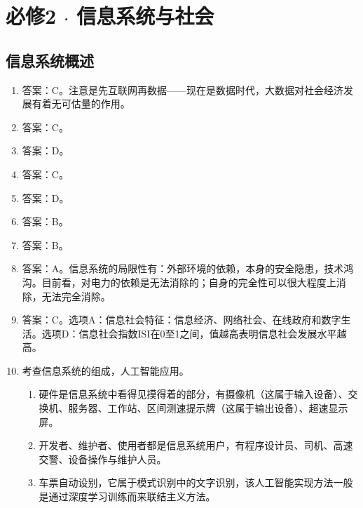 \chapter{必修2 $\cdot$ 信息系统与社会}
\section{信息系统概述}

\begin{enumerate}
\item 答案：C。注意是先互联网再数据——现在是数据时代，大数据对社会经济发展有着无可估量的作用。

\item 答案：C。

\item 答案：D。

\item 答案：C。

\item 答案：D。

\item 答案：B。

\item 答案：B。

\item 答案：A。信息系统的局限性有：外部环境的依赖，本身的安全隐患，技术鸿沟。目前看，对电力的依赖是无法消除的；自身的完全性可以很大程度上消除，无法完全消除。

\item 答案：C。选项A：信息社会特征：信息经济、网络社会、在线政府和数字生活。选项D：信息社会指数ISI在0至1之间，值越高表明信息社会发展水平越高。

\item 考查信息系统的组成，人工智能应用。
	\begin{enumerate}[label=$(\arabic*)$]
	\item 硬件是信息系统中看得见摸得着的部分，有摄像机（这属于输入设备）、交换机、服务器、工作站、区间测速提示牌（这属于输出设备）、超速显示屏。
	\item 开发者、维护者、使用者都是信息系统用户，有程序设计员、司机、高速交警、设备操作与维护人员。
	\item 车票自动设别，它属于模式识别中的文字识别，该人工智能实现方法一般是通过深度学习训练而来联结主义方法。
	\end{enumerate}



\end{enumerate}


\newpage
